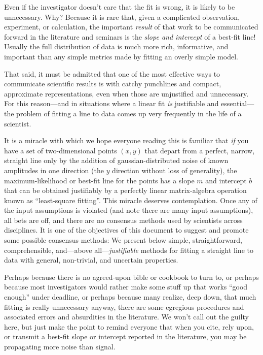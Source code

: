 \documentclass[12pt]{article}
\newcounter{problem}
\begin{document}
Even if the investigator doesn't care that the fit is wrong, it is
likely to be unnecessary.  Why?  Because it is rare that, given a
complicated observation, experiment, or calculation, the important
\emph{result} of that work to be communicated forward in the
literature and seminars is the \emph{slope and intercept} of a
best-fit line!  Usually the full distribution of data is much more
rich, informative, and important than any simple metrics made by
fitting an overly simple model.

That said, it must be admitted that one of the most effective ways to
communicate scientific results is with catchy punchlines and compact,
approximate representations, even when those are unjustified and
unnecessary.  For this reason---and in situations where a linear fit
\emph{is} justifiable and essential---the problem of fitting a line to
data comes up very frequently in the life of a scientist.

It is a miracle with which we hope everyone reading this is familiar
that \emph{if} you have a set of two-dimensional points $(x,y)$ that
depart from a perfect, narrow, straight line only by the addition of
gaussian-distributed noise of known amplitudes in one direction (the
$y$ direction without loss of generality), the maximum-likelihood or
best-fit line for the points has a slope $m$ and intercept $b$ that
can be obtained justifiably by a perfectly linear matrix-algebra
operation known as ``least-square fitting''.  This miracle deserves
contemplation.  Once any of the input assumptions is violated (and
note there are many input assumptions), all bets are off, and there
are no consensus methods used by scientists across disciplines.  It is
one of the objectives of this document to suggest and promote some
possible consensus methods: We present below simple, straightforward,
comprehensible, and---above all---\emph{justifiable} methods for
fitting a straight line to data with general, non-trivial, and
uncertain properties.

Perhaps because there is no agreed-upon bible or cookbook to turn to,
or perhaps because most investigators would rather make some stuff up
that works ``good enough'' under deadline, or perhaps because many
realize, deep down, that much fitting is really unnecessary anyway,
there are some egregious procedures and associated errors and
absurdities in the literature.  We won't call out the guilty here, but
just make the point to remind everyone that when you cite, rely upon,
or transmit a best-fit slope or intercept reported in the literature,
you may be propagating more noise than signal.
\end{document}
